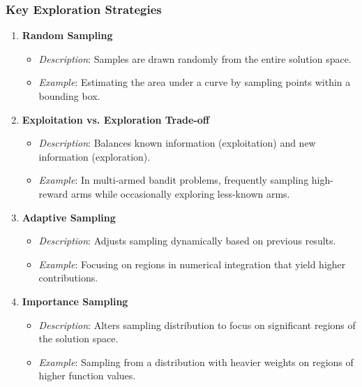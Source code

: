 \documentclass[aspectratio=169]{beamer}
\begin{document}
\begin{frame}[fragile]
    \frametitle{Key Exploration Strategies}
    \begin{enumerate}
        \item \textbf{Random Sampling}
            \begin{itemize}
                \item \textit{Description}: Samples are drawn randomly from the entire solution space.
                \item \textit{Example}: Estimating the area under a curve by sampling points within a bounding box.
            \end{itemize}

        \item \textbf{Exploitation vs. Exploration Trade-off}
            \begin{itemize}
                \item \textit{Description}: Balances known information (exploitation) and new information (exploration).
                \item \textit{Example}: In multi-armed bandit problems, frequently sampling high-reward arms while occasionally exploring less-known arms.
            \end{itemize}

        \item \textbf{Adaptive Sampling}
            \begin{itemize}
                \item \textit{Description}: Adjusts sampling dynamically based on previous results.
                \item \textit{Example}: Focusing on regions in numerical integration that yield higher contributions.
            \end{itemize}

        \item \textbf{Importance Sampling}
            \begin{itemize}
                \item \textit{Description}: Alters sampling distribution to focus on significant regions of the solution space.
                \item \textit{Example}: Sampling from a distribution with heavier weights on regions of higher function values.
            \end{itemize}
    \end{enumerate}
\end{frame}
\end{document}
